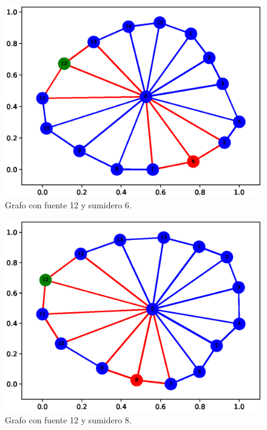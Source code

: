 \documentclass[12pt, a4paper]{article}
\begin{document}
\begin{figure} [H] \centering
\includegraphics[scale=0.8]{G3}
\caption{Grafo con fuente 12 y sumidero 6.}
\label{fig: g3}
\end{figure}

\begin{figure} [H] \centering
\includegraphics[scale=0.8]{G4}
\caption{Grafo con fuente 12 y sumidero 8.}
\label{fig: g4}
\end{figure}
\end{document}
